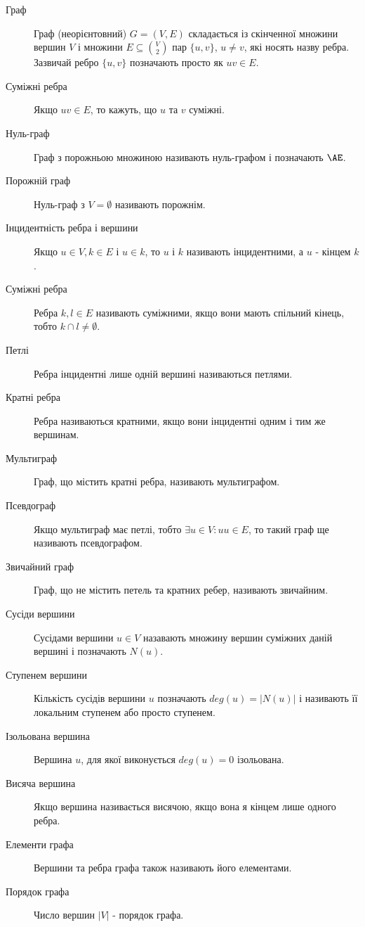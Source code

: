 \begin{description}
\item[Граф] Граф (неорієнтовний) $G = (V,E)$ складається із скінченної множини вершин $V$ і множини $E \subseteq {V \choose 2}$ пар $\{u,v\}$, $u \neq v$, які носять назву ребра.
  Зазвичай ребро $\lbrace u,v \rbrace$ позначають просто як $uv \in E$.
\item[Суміжні ребра] Якщо $uv \in E$, то кажуть, що $u$ та $v$ суміжні.
        \item[Нуль-граф] Граф з порожньою множиною називають нуль-графом і позначають $\AE$.
        \item[Порожній граф] Нуль-граф з $V=\emptyset$ називають порожнім.
        \item[Інцидентність ребра і вершини] Якщо $u \in V, k \in E$ і $u \in k$, то $u$ і $k$ називають інцидентними, а $u$ - кінцем $k$.
        \item[Суміжні ребра] Ребра $k,l \in E$ називають суміжними, якщо вони мають спільний кінець, тобто $k \cap l \ne \emptyset$.
        \item[Петлі] Ребра інцидентні лише одній вершині називаються петлями.
        \item[Кратні ребра] Ребра називаються кратними, якщо вони інцидентні одним і тим же вершинам.
        \item[Мультиграф] Граф, що містить кратні ребра, називають мультиграфом.
        \item[Псевдограф] Якщо мультиграф має петлі, тобто $\exists u \in V : uu \in E$, то такий граф ще називають псевдографом.
        \item[Звичайний граф] Граф, що не містить петель та кратних ребер, називають звичайним.
        \item[Сусіди вершини] Сусідами вершини $u \in V$ назавають множину вершин суміжних даній вершині і позначають $N(u)$.
        \item[Ступенем вершини] Кількість сусідів вершини $u$ позначають $deg(u) = \vert N(u) \vert$ і називають її локальним ступенем або просто ступенем.
        \item[Ізольована вершина] Вершина $u$, для якої виконується $deg(u) = 0$ ізольована.
        \item[Висяча вершина] Якщо вершина називається висячою, якщо вона я кінцем лише одного ребра.
        \item[Елементи графа] Вершини та ребра графа також називають його елементами.
        \item[Порядок графа] Число вершин $\vert V \vert$ - порядок графа.

\end{description}
